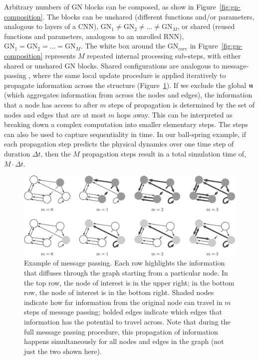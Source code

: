 Arbitrary numbers of GN blocks can be composed, as show in Figure~\ref{fig:gn-composition}. The blocks can be unshared (different functions and/or parameters, analogous to layers of a CNN), $\textrm{GN}_1 \neq \textrm{GN}_2 \neq \dots \neq \textrm{GN}_M$, or shared (reused functions and parameters, analogous to an unrolled RNN), $\textrm{GN}_1 = \textrm{GN}_2 = \dots = \textrm{GN}_M$. The white box around the $\textrm{GN}_{core}$ in Figure~\ref{fig:gn-composition} represents $M$ repeated internal processing sub-steps, with either shared or unshared GN blocks. Shared configurations are analogous to message-passing \citep{gilmer2017neural}, where the same local update procedure is applied iteratively to propagate information across the structure (Figure~\ref{fig:message-passing}). 
If we exclude the global $\mathbf{u}$ (which aggregates information from across the nodes and edges), the information that a node has access to after $m$ steps of propagation is determined by the set of nodes and edges that are at most $m$ hops away. This can be interpreted as breaking down a complex computation into smaller elementary steps. The steps can also be used to capture sequentiality in time. In our ball-spring example, if each propagation step predicts the physical dynamics over one time step of duration $\Delta t$, then the $M$ propagation steps result in a total simulation time of, $M\!\cdot\!\Delta t$. 


\begin{figure}[t]
\centering
\includegraphics[width=\textwidth]{figures/message-passing}
\caption{Example of message passing. Each row highlights the information that diffuses through the graph starting from a particular node. In the top row, the node of interest is in the upper right; in the bottom row, the node of interest is in the bottom right. Shaded nodes indicate how far information from the original node can travel in $m$ steps of message passing; bolded edges indicate which edges that information has the potential to travel across. Note that during the full message passing procedure, this propagation of information happens simultaneously for all nodes and edges in the graph (not just the two shown here).}
\label{fig:message-passing}
\end{figure}


